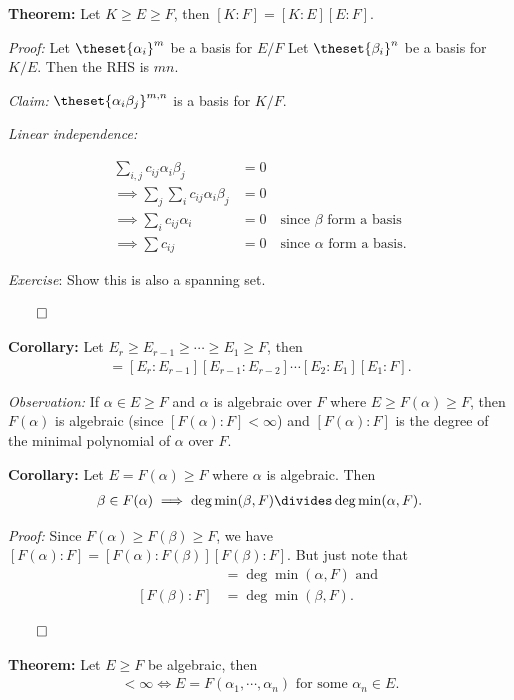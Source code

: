 \textbf{Theorem:} Let \(K \geq E \geq F\), then
\([K: F] = [K: E] [E: F]\).

\emph{Proof:} Let \(\theset{\alpha_i}^m\) be a basis for \(E/F\) Let
\(\theset{\beta_i}^n\) be a basis for \(K / E\). Then the RHS is \(mn\).

\emph{Claim:} \(\theset{\alpha_i \beta_j}^{m, n}\) is a basis for
\(K/ F\).

\emph{Linear independence:}

\begin{align*}
\sum_{i, j} c_{ij} \alpha _i \beta_j &= 0 \\
\implies \sum_j \sum_i c_{ij} \alpha_i \beta_j &= 0 \\
\implies \sum_i c_{ij} \alpha_i &= 0 \quad \text{since $\beta$ form a basis} \\
\implies \sum c_{ij} &= 0 \quad \text{since $\alpha$ form a basis}
.\end{align*}

\emph{Exercise}: Show this is also a spanning set.

\(\qed\)

\textbf{Corollary:} Let
\(E_r \geq E_{r-1} \geq \cdots \geq E_1 \geq F\), then
\begin{align*}
[E_r: F]= [E_r: E_{r-1}][E_{r-1}:E_{r-2}] \cdots [E_2: E_1][E_1 : F]
.\end{align*}

\emph{Observation:} If \(\alpha \in E \geq F\) and \(\alpha\) is
algebraic over \(F\) where \(E \geq F(\alpha) \geq F\), then
\(F(\alpha)\) is algebraic (since \([F(\alpha): F] < \infty\)) and
\([F(\alpha): F]\) is the degree of the minimal polynomial of \(\alpha\)
over \(F\).

\textbf{Corollary:} Let \(E = F(\alpha) \geq F\) where \(\alpha\) is
algebraic. Then
\begin{align*}\beta \in F(\alpha) \implies \deg \min(\beta, F) \divides \deg \min(\alpha, F)
.\end{align*}

\emph{Proof:} Since \(F(\alpha) \geq F(\beta) \geq F\), we have
\([F(\alpha): F] = [F(\alpha): F(\beta)][F(\beta): F]\). But just note
that \begin{align*}
[F(\alpha): F]  &= \deg \min (\alpha, F) \text{ and } \\
[F(\beta): F]   &= \deg \min (\beta, F)
.\end{align*}

\(\qed\)

\textbf{Theorem:} Let \(E \geq F\) be algebraic, then
\begin{align*}
[E: F] < \infty \iff E = F(\alpha_1, \cdots, \alpha_n)
\text{ for some }
\alpha_n \in E
.\end{align*}


